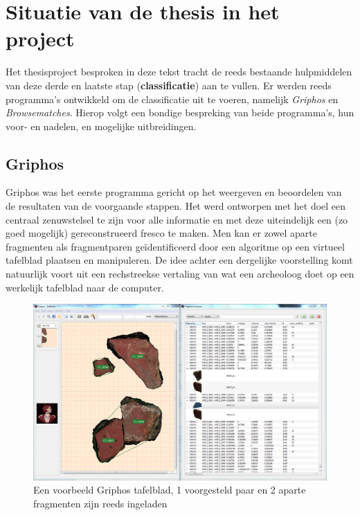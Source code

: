 \section{Situatie van de thesis in het project}
Het thesisproject besproken in deze tekst tracht de reeds bestaande hulpmiddelen van deze derde en laatste stap (\textbf{classificatie}) aan te vullen. Er werden reeds programma's ontwikkeld om de classificatie uit te voeren, namelijk \emph{Griphos} en \emph{Browsematches}. Hierop volgt een bondige bespreking van beide programma's, hun voor- en nadelen, en mogelijke uitbreidingen.

\subsection{Griphos}

Griphos was het eerste programma gericht op het weergeven en beoordelen van de resultaten van de voorgaande stappen. Het werd ontworpen met het doel een centraal zenuwstelsel te zijn voor alle informatie en met deze uiteindelijk een (zo goed mogelijk) gereconstrueerd fresco te maken. Men kan er zowel aparte fragmenten als fragmentparen ge\"identificeerd door een algoritme op een virtueel tafelblad plaatsen en manipuleren. De idee achter een dergelijke voorstelling komt natuurlijk voort uit een rechstreekse vertaling van wat een archeoloog doet op een werkelijk tafelblad naar de computer.\\

\begin{figure}[ht]
	\begin{center}
		\includegraphics[width=.8\columnwidth]{images/griphos-01-cut.png}
		\caption{Een voorbeeld Griphos tafelblad, 1 voorgesteld paar en 2 aparte fragmenten zijn reeds ingeladen}
	\end{center}
\end{figure}

